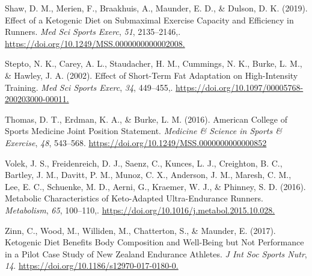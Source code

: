 \documentclass[]{cik}%
\newlength{\cslhangindent}
\newlength{\cslentryspacingunit} %
\newenvironment{CSLReferences}[2] %
 {%
  \setlength{\parindent}{0pt}
  \ifodd #1
  \let\oldpar\par
  \def\par{\hangindent=\cslhangindent\oldpar}
  \fi
  \setlength{\parskip}{#2\cslentryspacingunit}
 }%
 {}
\begin{document}
\begin{CSLReferences}{1}{0}
\leavevmode{}%
Shaw, D. M., Merien, F., Braakhuis, A., Maunder, E. D., \& Dulson, D. K.
(2019). Effect of a Ketogenic Diet on Submaximal Exercise Capacity and
Efficiency in Runners. \emph{Med Sci Sports Exerc}, \emph{51},
2135--2146,. \url{https://doi.org/10.1249/MSS.0000000000002008.}

\leavevmode{}%
Stepto, N. K., Carey, A. L., Staudacher, H. M., Cummings, N. K., Burke,
L. M., \& Hawley, J. A. (2002). Effect of Short-Term Fat Adaptation on
High-Intensity Training. \emph{Med Sci Sports Exerc}, \emph{34},
449--455,. \url{https://doi.org/10.1097/00005768-200203000-00011.}

\leavevmode{}%
Thomas, D. T., Erdman, K. A., \& Burke, L. M. (2016). American College
of Sports Medicine Joint Position Statement. \emph{Medicine \& Science
in Sports \& Exercise}, \emph{48}, 543--568.
\url{https://doi.org/10.1249/MSS.0000000000000852}

\leavevmode{}%
Volek, J. S., Freidenreich, D. J., Saenz, C., Kunces, L. J., Creighton,
B. C., Bartley, J. M., Davitt, P. M., Munoz, C. X., Anderson, J. M.,
Maresh, C. M., Lee, E. C., Schuenke, M. D., Aerni, G., Kraemer, W. J.,
\& Phinney, S. D. (2016). Metabolic Characteristics of Keto-Adapted
Ultra-Endurance Runners. \emph{Metabolism}, \emph{65}, 100--110,.
\url{https://doi.org/10.1016/j.metabol.2015.10.028.}

\leavevmode{}%
Zinn, C., Wood, M., Williden, M., Chatterton, S., \& Maunder, E. (2017).
Ketogenic Diet Benefits Body Composition and Well-Being but Not
Performance in a Pilot Case Study of New Zealand Endurance Athletes.
\emph{J Int Soc Sports Nutr}, \emph{14}.
\url{https://doi.org/10.1186/s12970-017-0180-0.}

\end{CSLReferences}

%
%

%
%
%
%
\end{document}
